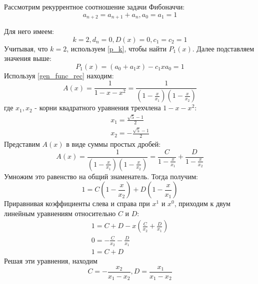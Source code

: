 \begin{task}
    Рассмотрим рекуррентное соотношение задачи Фибоначчи:
    \begin{equation*}
        a_{n+2} = a_{n+1} + a_n, a_0 = a_1 = 1
    \end{equation*}
    \begin{solution}
        Для него имеем:
        \begin{equation*}
            k = 2, d_n = 0, D(x) = 0, c_1 = c_2 = 1
        \end{equation*}
        Учитывая, что $k = 2$, используем \ref{p_k}, чтобы найти $P_1(x)$. Далее подставляем значения выше:
        \begin{equation*}
            P_1(x) = (a_0 + a_1 x) - c_1 x a_0 = 1
        \end{equation*}
        Используя \ref{gen_func_rec} находим:
        \begin{equation*}
            A(x) = \frac{1}{1 - x - x^2} = \frac{1}{(1 - \frac{x}{x_1})(1 - \frac{x}{x_2})}
        \end{equation*}
        где $x_1, x_2$ - корни квадратного уравнения трехчлена $1 - x - x^2$:
        \begin{gather*}
            x_1 = \frac{\sqrt{5} - 1}{2} \\
            x_2 = -\frac{\sqrt{5} - 1}{2}
        \end{gather*}
        Представим $A(x)$ в виде суммы простых дробей:
        \begin{equation*}
            A(x) = \frac{1}{(1 - \frac{x}{x_1})(1 - \frac{x}{x_2})} = \frac{C}{1 - \frac{x}{x_1}} + \frac{D}{1 - \frac{x}{x_2}}
        \end{equation*}
        Умножим это равенство на общий знаменатель. Тогда получим:
        \begin{equation*}
            1 = C(1 - \frac{x}{x_2}) + D(1 - \frac{x}{x_1})
        \end{equation*}
        Приравнивая коэффициенты слева и справа при $x^1$ и $x^0$, приходим к двум линейным уравнениям
        относительно $C$ и $D$:
        \begin{gather*}
            1 = C + D - x\left(\frac{C}{x_2} + \frac{D}{x_1}\right) \\
            0 = -\frac{C}{x_2} - \frac{D}{x_1} \\
            1 = C + D
        \end{gather*}
        Решая эти уравнения, находим
        \begin{equation*}
            C = -\frac{x_2}{x_1 - x_2}, D = \frac{x_1}{x_1 - x_2}

\end{equation*}
\end{solution}
\end{task}
